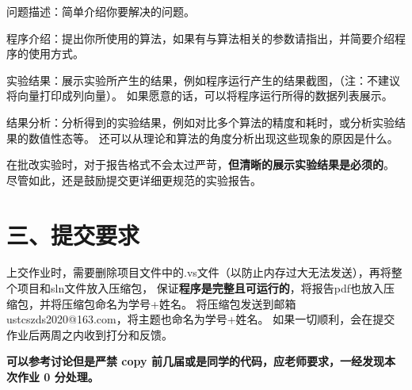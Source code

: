 \documentclass{article}
\begin{document}
问题描述：简单介绍你要解决的问题。

程序介绍：提出你所使用的算法，如果有与算法相关的参数请指出，并简要介绍程序的使用方式。

实验结果：展示实验所产生的结果，例如程序运行产生的结果截图，（注：不建议将向量打印成列向量）。
如果愿意的话，可以将程序运行所得的数据列表展示。

结果分析：分析得到的实验结果，例如对比多个算法的精度和耗时，或分析实验结果的数值性态等。
还可以从理论和算法的角度分析出现这些现象的原因是什么。

在批改实验时，对于报告格式不会太过严苛，\textbf{但清晰的展示实验结果是必须的}。
尽管如此，还是鼓励提交更详细更规范的实验报告。

\section*{三、提交要求}

上交作业时，需要删除项目文件中的.vs文件（以防止内存过大无法发送），再将整个项目和sln文件放入压缩包，
保证\textbf{程序是完整且可运行的}，将报告pdf也放入压缩包，并将压缩包命名为学号+姓名。
将压缩包发送到邮箱 ustcszds2020@163.com，将主题也命名为学号+姓名。
如果一切顺利，会在提交作业后两周之内收到打分和反馈。

\textbf{可以参考讨论但是严禁 copy 前几届或是同学的代码，应老师要求，一经发现本次作业 0 分处理。}
\end{document}

